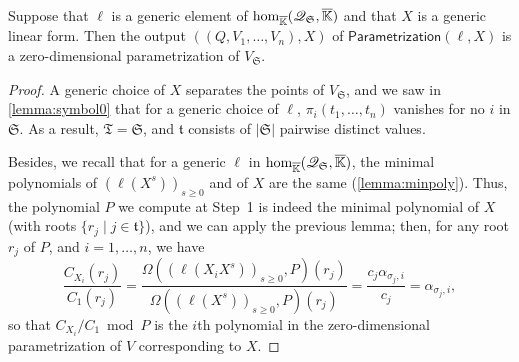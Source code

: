 \documentclass[12pt]{article}
\newcommand{\minpoly}{P}
\newcommand{\lf}{X}
\newcommand{\residueI}{\mathscr{Q}}
\newcommand{\sqfree}{Q}
\def\Kbar {{\ensuremath{\overline{\mathbb{K}}}}}
\begin{document}
\begin{lemma}\label{lemma:para2}
  Suppose that $\ell$ is a generic element of ${\rm
    hom}_{\Kbar}(\residueI_\mathfrak{S},\Kbar)$ and that $\lf$ is a generic
  linear form. Then the output $((\sqfree,V_1,\dots,V_n),\lf)$ of
  $\mathsf{Parametrization}(\ell,\lf)$ is a zero-dimensional
  parametrization of $V_{\mathfrak{S}}$.
\end{lemma}
\begin{proof}
  A generic choice of $\lf$ separates the points of
  $V_{\mathfrak{S}}$, and we saw in \cref{lemma:symbol0} that for a
  generic choice of $\ell$, $\pi_i(t_1,\dots,t_n)$ vanishes for no $i$
  in $\mathfrak{S}$.  As a result, $\mathfrak{T}=\mathfrak{S}$,
  and $\mathfrak{t}$ consists of $|\mathfrak{S}|$ pairwise distinct 
  values.

  Besides, we recall that for a generic $\ell$ in ${\rm
    hom}_{\Kbar}(\residueI_\mathfrak{S},\Kbar)$, the minimal polynomials of
  $(\ell(\lf^s))_{s \ge 0}$ and of $\lf$ are the same
  (\cref{lemma:minpoly}).  Thus, the polynomial $\minpoly$ we compute
  at Step~1 is indeed the minimal polynomial of $\lf$ (with roots
  $\{r_j \mid j \in \mathfrak{t}\}$), and we can apply the previous
  lemma; then, for any root $r_j$ of $\minpoly$, and $i=1,\dots,n$, we
  have
  $$\frac{ C_{X_i}(r_j)}{ C_1(r_j)} = \frac{\Omega((\ell(X_i
    \lf^s))_{s\ge0}, \minpoly)(r_j)}{\Omega((\ell(\lf^s))_{s\ge0} ,\minpoly)(r_j)}=
  \frac{c_j \alpha_{\sigma_j,i}}{c_j} = \alpha_{\sigma_j,i},$$ so that
  $ C_{X_i}/ C_1 \bmod P$ is the $i$th polynomial in the
  zero-dimensional parametrization of $V$ corresponding to $\lf$.
\end{proof}
\end{document}
